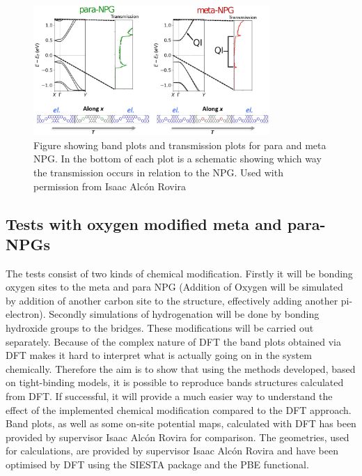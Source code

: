 \begin{figure}[ht]
	\centering
	\includegraphics[width=0.8\textwidth]{Figures/metapararesultdraft.eps}
	\caption{Figure showing band plots and transmission plots for para and meta NPG. In the bottom of each plot is a schematic showing which way the transmission occurs in relation to the NPG. Used with permission from Isaac Alcón Rovira}
	\label{metapara}
\end{figure}
\newpage
\subsection{Tests with oxygen modified meta and para-NPGs}\label{test1}
The tests consist of two kinds of chemical modification. Firstly it will be bonding oxygen sites to the meta and para NPG (Addition of Oxygen will be simulated by addition of another carbon site to the structure, effectively adding another pi-electron). Secondly simulations of hydrogenation will be done by bonding hydroxide groups to the bridges. These modifications will be carried out separately. Because of the complex nature of DFT the band plots obtained via DFT makes it hard to interpret what is actually going on in the system chemically. Therefore the aim is to show that using the methods developed, based on tight-binding models, it is possible to reproduce bands structures calculated from DFT. If successful, it will provide a much easier way to understand the effect of the implemented chemical modification compared to the DFT approach. Band plots, as well as some on-site potential maps, calculated with DFT has been provided by supervisor Isaac Alcón Rovira for comparison. The geometries, used for calculations, are provided by supervisor Isaac Alcón Rovira and have been optimised by DFT using the SIESTA package\cite{Soler_2002} and the PBE functional\cite{perdew1996a}.
